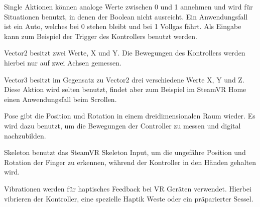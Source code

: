 Single Aktionen können analoge Werte zwischen 0 und 1 annehmen und wird für Situationen benutzt, in denen der Boolean nicht ausreicht.
Ein Anwendungsfall ist ein Auto, welches bei 0 stehen bleibt und bei 1 Vollgas fährt.
Als Eingabe kann zum Beispiel der Trigger des Kontrollers benutzt werden.

Vector2 besitzt zwei Werte, X und Y.
Die Bewegungen des Kontrollers werden hierbei nur auf zwei Achsen gemessen.

Vector3 besitzt im Gegensatz zu Vector2 drei verschiedene Werte X, Y und Z.
Diese Aktion wird selten benutzt, findet aber zum Beispiel im SteamVR Home einen Anwendungsfall beim Scrollen.

Pose gibt die Position und Rotation in einem dreidimensionalen Raum wieder.
Es wird dazu benutzt, um die Bewegungen der Controller zu messen und digital nachzubilden.

Skeleton benutzt das SteamVR Skeleton Input, um die ungefähre Position und Rotation der Finger zu erkennen, während der Kontroller in den Händen gehalten wird.

Vibrationen werden für haptisches Feedback bei VR Geräten verwendet.
Hierbei vibrieren der Kontroller, eine spezielle Haptik Weste oder ein präparierter Sessel.
~\cite{SteamVR_Input_2022}


